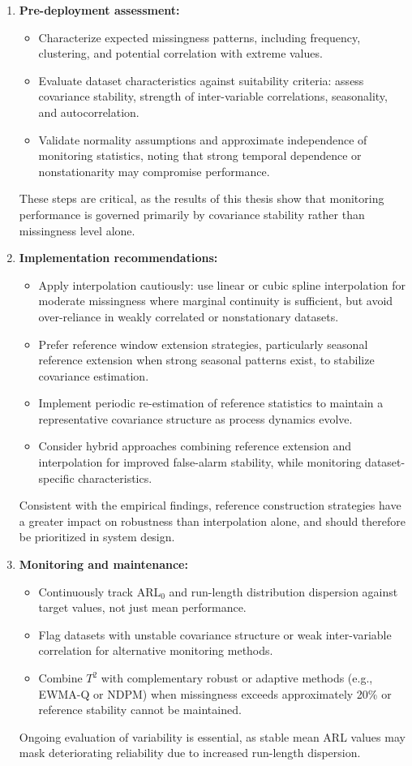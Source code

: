 \begin{enumerate}
	\item \textbf{Pre-deployment assessment:}
	\begin{itemize}
		\item Characterize expected missingness patterns, including frequency, clustering, and potential correlation with extreme values.
		\item Evaluate dataset characteristics against suitability criteria: assess covariance stability, strength of inter-variable correlations, seasonality, and autocorrelation.
		\item Validate normality assumptions and approximate independence of monitoring statistics, noting that strong temporal dependence or nonstationarity may compromise performance.
	\end{itemize}
    These steps are critical, as the results of this thesis show that monitoring performance is governed primarily by covariance stability rather than missingness level alone.
	
	\item \textbf{Implementation recommendations:}
	\begin{itemize}
		\item Apply interpolation cautiously: use linear or cubic spline interpolation for moderate missingness where marginal continuity is sufficient, but avoid over-reliance in weakly correlated or nonstationary datasets.
		\item Prefer reference window extension strategies, particularly seasonal reference extension when strong seasonal patterns exist, to stabilize covariance estimation.
		\item Implement periodic re-estimation of reference statistics to maintain a representative covariance structure as process dynamics evolve.
		\item Consider hybrid approaches combining reference extension and interpolation for improved false-alarm stability, while monitoring dataset-specific characteristics.
	\end{itemize}
    Consistent with the empirical findings, reference construction strategies have a greater impact on robustness than interpolation alone, and should therefore be prioritized in system design.
	
	\item \textbf{Monitoring and maintenance:}
	\begin{itemize}
		\item Continuously track \ac{ARL}$_0$ and run-length distribution dispersion against target values, not just mean performance.
		\item Flag datasets with unstable covariance structure or weak inter-variable correlation for alternative monitoring methods.
		\item Combine $T^2$ with complementary robust or adaptive methods (e.g., EWMA-Q or NDPM) when missingness exceeds approximately 20\% or reference stability cannot be maintained.
	\end{itemize}
    Ongoing evaluation of variability is essential, as stable mean \ac{ARL} values may mask deteriorating reliability due to increased run-length dispersion.
\end{enumerate}

